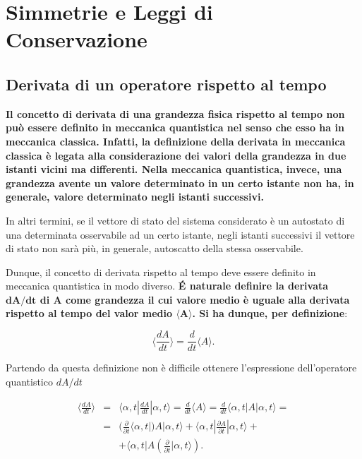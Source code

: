 \chapter[Simmetrie e Leggi di Conservazione]{Simmetrie e Leggi di\\ Conservazione} 
\section{Derivata di un operatore rispetto al tempo} 

\textbf{Il concetto di derivata di una grandezza fisica rispetto al tempo non può essere definito in meccanica quantistica nel senso che esso ha in meccanica classica. Infatti, la definizione della derivata in meccanica classica è legata alla considerazione dei valori della grandezza in due istanti vicini ma differenti. Nella meccanica quantistica, invece, una grandezza avente un valore determinato in un certo istante non ha, in generale, valore determinato negli istanti successivi.} 

In altri termini, se il vettore di stato del sistema considerato è un autostato di una determinata osservabile ad un certo istante, negli istanti successivi il vettore di stato non sarà più, in generale, autoscatto della stessa osservabile.

Dunque, il concetto di derivata rispetto al tempo deve essere definito in meccanica quantistica in modo diverso.
\textbf{\'E naturale definire la derivata $\mathbf{dA/dt}$ di A come grandezza il cui valore medio è uguale alla derivata rispetto al tempo del valor medio $\mathbf{\langle A \rangle} $.
Si ha dunque, per definizione}:

\begin{equation}
\langle \frac{dA}{dt} \rangle = \frac{d}{dt} \langle A \rangle .
\end{equation}

Partendo da questa definizione non è difficile ottenere l'espressione dell'operatore quantistico $dA/dt$

\begin{eqnarray}
\label{eq:cap12_1}
\langle \frac{dA}{dt} \rangle &=& \langle \alpha,t| \frac{dA}{dt}| \alpha,t \rangle = \frac{d}{dt} \langle A \rangle = \frac{d}{dt} \langle \alpha ,t |A| \alpha ,t\rangle= \nonumber\\
&=&(\frac{\partial }{\partial{t}}\langle \alpha,t|) A|\alpha,t \rangle + \langle \alpha,t| \frac{\partial A}{\partial{t}}|\alpha,t \rangle + \\
& &+\langle\alpha,t|A (\frac{\partial }{\partial{t}}|\alpha,t\rangle).\nonumber
\end{eqnarray} 

